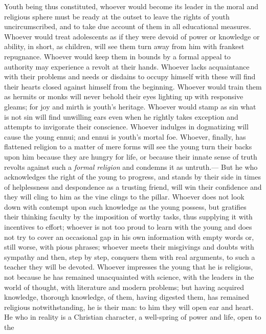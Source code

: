 Youth being thus constituted, whoever would become its leader in the moral and religious sphere must be ready at the outset to leave the rights of youth uncircumscribed, and to take due account of them in all educational measures. Whoever would treat adolescents as if they were devoid of power or knowledge or ability, in short, as children, will see them turn away from him with frankest repugnance. Whoever would keep them in bounds by a formal appeal to authority may experience a revolt at their hands. Whoever
lacks acquaintance with their problems and needs or disdains to occupy himself with these will find their hearts closed against himself from the beginning. Whoever would train them as hermits or monks will never behold their eyes lighting up with responsive gleams; for joy and mirth is youth’s heritage. Whoever would stamp as sin what is not sin will find unwilling ears even when he rightly takes exception and attempts to invigorate their conscience. Whoever indulges in dogmatizing will cause the young ennui; and ennui is youth’s mortal foe. Whoever, finally, has flattened religion to a matter of mere forms will see the young turn their backs upon him because they are hungry for life, or because their innate sense of truth revolts against such a \emph{formal religion} and condemns it as untruth.— But he who acknowledges the right of the young to progress, and stands by their side in times of helplessness and despondence as a trusting friend, will win their confidence and they will cling to him as the vine clings to the pillar. Whoever does not look down with contempt upon such knowledge as the young possess, but gratifies their thinking faculty by the imposition of worthy tasks, thus supplying it with incentives to effort; whoever is not too proud to learn with the young and does not try to cover an occasional gap in his own information with empty words or, still worse, with pious phrases; whoever meets their misgivings and doubts with sympathy and then, step by step, conquers them with real arguments, to such a teacher they will be devoted. Whoever impresses the young that he is religious, not because he has remained unacquainted with science, with the leaders in the world of thought, with literature and modern problems; but having acquired knowledge, thorough knowledge, of them, having digested them, has remained religious notwithstanding, he is their man: to him they will open ear and heart. He who in reality is a Christian character, a well-spring of power and life, open to the
